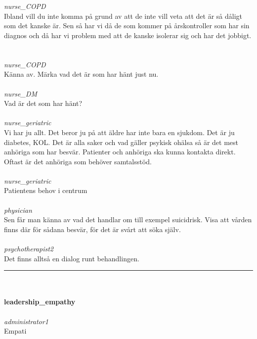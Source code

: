 \documentclass[12pt,a4paper,oneside]{article}
\begin{document}
\ \\\ \\
 { \it   nurse\_COPD %
}\\
Ibland vill du inte komma p{\aa} grund av att de inte vill veta att det {\"a}r s{\aa} d{\aa}ligt som det kanske {\"a}r. Sen s{\aa} har vi d{\aa} de som kommer p{\aa} {\aa}rskontroller som har sin diagnos och d{\aa} har vi problem med att de kanske isolerar sig och har det jobbigt. %
\ \\\ \\
 { \it   nurse\_COPD %
}\\
K{\"a}nna av. M{\"a}rka vad det {\"a}r som har h{\"a}nt just nu. %
\ \\\ \\
 { \it   nurse\_DM %
}\\
Vad {\"a}r det som har h{\"a}nt? %
\ \\\ \\
 { \it   nurse\_geriatric %
}\\
Vi har ju allt. Det beror ju p{\aa} att {\"a}ldre har inte bara en sjukdom. Det {\"a}r ju diabetes, KOL. Det {\"a}r alla saker och vad g{\"a}ller psykisk oh{\"a}lsa s{\aa} {\"a}r det mest anh{\"o}riga som har besv{\"a}r. Patienter och anh{\"o}riga ska kunna kontakta direkt. Oftast {\"a}r det anh{\"o}riga som beh{\"o}ver samtalsst{\"o}d.  %
\ \\\ \\
 { \it   nurse\_geriatric %
}\\
Patientens behov i centrum %
\ \\\ \\
 { \it   physician %
}\\
Sen f{\aa}r man k{\"a}nna av vad det handlar om till exempel suicidrisk. Visa att v{\aa}rden finns d{\"a}r f{\"o}r s{\aa}dana besv{\"a}r, f{\"o}r det {\"a}r sv{\aa}rt att s{\"o}ka sj{\"a}lv. %
\ \\\ \\
 { \it   psychotherapist2 %
}\\
Det finns allts{\aa} en dialog runt behandlingen. %


\hrule
\ \\\ \\{\bf leadership\_empathy }
\\\ \\%
 { \it administrator1 %
}\\
Empati %
\end{document}
